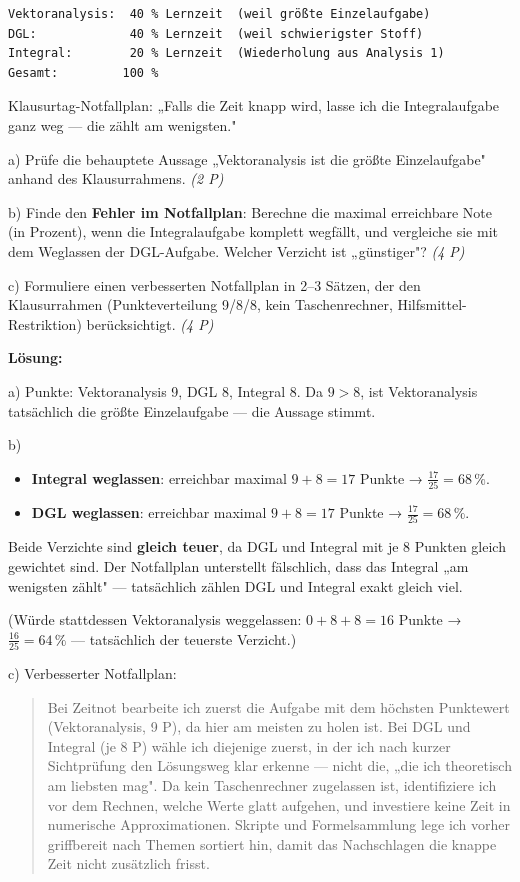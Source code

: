 \documentclass[11pt, a4paper]{article}
\begin{document}
\begin{lstlisting}
Vektoranalysis:  40 % Lernzeit  (weil größte Einzelaufgabe)
DGL:             40 % Lernzeit  (weil schwierigster Stoff)
Integral:        20 % Lernzeit  (Wiederholung aus Analysis 1)
Gesamt:         100 %
\end{lstlisting}

Klausurtag-Notfallplan: „Falls die Zeit knapp wird, lasse ich die Integralaufgabe ganz weg — die zählt am wenigsten."


a) Prüfe die behauptete Aussage „Vektoranalysis ist die größte Einzelaufgabe" anhand des Klausurrahmens. \textit{(2 P)}


b) Finde den \textbf{Fehler im Notfallplan}: Berechne die maximal erreichbare Note (in Prozent), wenn die Integralaufgabe komplett wegfällt, und vergleiche sie mit dem Weglassen der DGL-Aufgabe. Welcher Verzicht ist „günstiger"? \textit{(4 P)}


c) Formuliere einen verbesserten Notfallplan in 2–3 Sätzen, der den Klausurrahmen (Punkteverteilung 9/8/8, kein Taschenrechner, Hilfsmittel-Restriktion) berücksichtigt. \textit{(4 P)}


\textbf{Lösung:}


a) Punkte: Vektoranalysis 9, DGL 8, Integral 8. Da $9 > 8$, ist Vektoranalysis tatsächlich die größte Einzelaufgabe — die Aussage stimmt.


b)

\begin{itemize}
  \item \textbf{Integral weglassen}: erreichbar maximal $9 + 8 = 17$ Punkte → $\frac{17}{25} = 68\,\%$.
  \item \textbf{DGL weglassen}: erreichbar maximal $9 + 8 = 17$ Punkte → $\frac{17}{25} = 68\,\%$.
\end{itemize}

Beide Verzichte sind \textbf{gleich teuer}, da DGL und Integral mit je 8 Punkten gleich gewichtet sind. Der Notfallplan unterstellt fälschlich, dass das Integral „am wenigsten zählt" — tatsächlich zählen DGL und Integral exakt gleich viel.


(Würde stattdessen Vektoranalysis weggelassen: $0 + 8 + 8 = 16$ Punkte → $\frac{16}{25} = 64\,\%$ — tatsächlich der teuerste Verzicht.)


c) Verbesserter Notfallplan:


\begin{quote}
Bei Zeitnot bearbeite ich zuerst die Aufgabe mit dem höchsten Punktewert (Vektoranalysis, 9 P), da hier am meisten zu holen ist. Bei DGL und Integral (je 8 P) wähle ich diejenige zuerst, in der ich nach kurzer Sichtprüfung den Lösungsweg klar erkenne — nicht die, „die ich theoretisch am liebsten mag". Da kein Taschenrechner zugelassen ist, identifiziere ich vor dem Rechnen, welche Werte glatt aufgehen, und investiere keine Zeit in numerische Approximationen. Skripte und Formelsammlung lege ich vorher griffbereit nach Themen sortiert hin, damit das Nachschlagen die knappe Zeit nicht zusätzlich frisst.
\end{quote}




\end{document}
